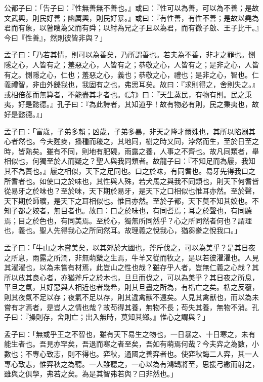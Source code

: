 \begin{pinyinscope}
公都子曰：「告子曰：『性無善無不善也。』或曰：『性可以為善，可以為不善；是故文武興，則民好善；幽厲興，則民好暴。』或曰：『有性善，有性不善；是故以堯為君而有象，以瞽瞍為父而有舜；以紂為兄之子且以為君，而有微子啟、王子比干。』今曰『性善』，然則彼皆非與？」

孟子曰：「乃若其情，則可以為善矣，乃所謂善也。若夫為不善，非才之罪也。惻隱之心，人皆有之；羞惡之心，人皆有之；恭敬之心，人皆有之；是非之心，人皆有之。惻隱之心，仁也；羞惡之心，義也；恭敬之心，禮也；是非之心，智也。仁義禮智，非由外鑠我也，我固有之也，弗思耳矣。故曰：『求則得之，舍則失之。』或相倍蓰而無算者，不能盡其才者也。《詩》曰：『天生蒸民，有物有則。民之秉夷，好是懿德。』孔子曰：『為此詩者，其知道乎！故有物必有則，民之秉夷也，故好是懿德。』」

孟子曰：「富歲，子弟多賴；凶歲，子弟多暴，非天之降才爾殊也，其所以陷溺其心者然也。今夫麰麥，播種而耰之，其地同，樹之時又同，浡然而生，至於日至之時，皆熟矣。雖有不同，則地有肥磽，雨露之養，人事之不齊也。故凡同類者，舉相似也，何獨至於人而疑之？聖人與我同類者。故龍子曰：『不知足而為屨，我知其不為蕢也。』屨之相似，天下之足同也。口之於味，有同耆也。易牙先得我口之所耆者也。如使口之於味也，其性與人殊，若犬馬之與我不同類也，則天下何耆皆從易牙之於味也？至於味，天下期於易牙，是天下之口相似也惟耳亦然。至於聲，天下期於師曠，是天下之耳相似也。惟目亦然。至於子都，天下莫不知其姣也。不知子都之姣者，無目者也。故曰：口之於味也，有同耆焉；耳之於聲也，有同聽焉；目之於色也，有同美焉。至於心，獨無所同然乎？心之所同然者何也？謂理也，義也。聖人先得我心之所同然耳。故理義之悅我心，猶芻豢之悅我口。」

孟子曰：「牛山之木嘗美矣，以其郊於大國也，斧斤伐之，可以為美乎？是其日夜之所息，雨露之所潤，非無萌櫱之生焉，牛羊又從而牧之，是以若彼濯濯也。人見其濯濯也，以為未嘗有材焉，此豈山之性也哉？雖存乎人者，豈無仁義之心哉？其所以放其良心者，亦猶斧斤之於木也，旦旦而伐之，可以為美乎？其日夜之所息，平旦之氣，其好惡與人相近也者幾希，則其旦晝之所為，有梏亡之矣。梏之反覆，則其夜氣不足以存；夜氣不足以存，則其違禽獸不遠矣。人見其禽獸也，而以為未嘗有才焉者，是豈人之情也哉？故苟得其養，無物不長；苟失其養，無物不消。孔子曰：『操則存，舍則亡；出入無時，莫知其鄉。』惟心之謂與？」

孟子曰：「無或乎王之不智也，雖有天下易生之物也，一日暴之、十日寒之，未有能生者也。吾見亦罕矣，吾退而寒之者至矣，吾如有萌焉何哉？今夫弈之為數，小數也；不專心致志，則不得也。弈秋，通國之善弈者也。使弈秋誨二人弈，其一人專心致志，惟弈秋之為聽。一人雖聽之，一心以為有鴻鵠將至，思援弓繳而射之，雖與之俱學，弗若之矣。為是其智弗若與？曰非然也。」


\end{pinyinscope}
